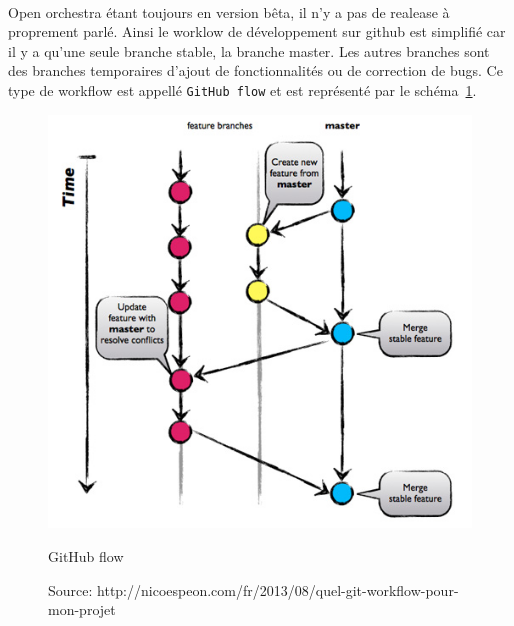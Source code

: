 \paragraph{}
Open orchestra étant toujours en version bêta, il n'y a pas de realease à proprement parlé. Ainsi le worklow de développement sur github est simplifié car il y a qu'une seule branche stable, la branche master. Les autres branches sont des branches temporaires d'ajout de fonctionnalités ou de correction de bugs. Ce type de workflow est appellé \verb?GitHub flow? et est représenté par le schéma~\ref{github}.
\begin{figure}[H]
  \begin{center}
    \includegraphics[scale=0.75]{images/github-flow}
  \end{center}
  \caption{GitHub flow}
  \caption*{Source: http://nicoespeon.com/fr/2013/08/quel-git-workflow-pour-mon-projet}
  \label{github}
\end{figure}

